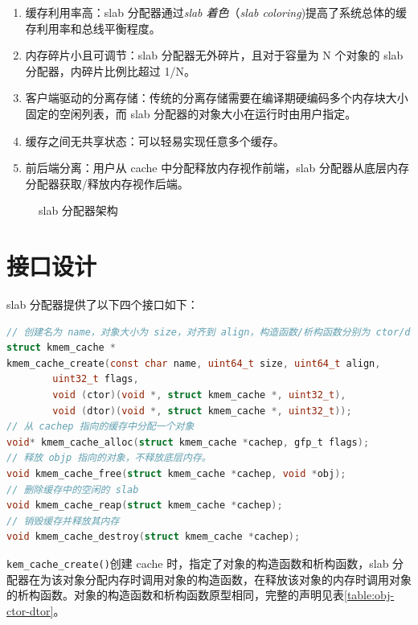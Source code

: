 \documentclass[AutoFakeBold]{LZUThesis}
\begin{document}
\begin{sloppypar}
\begin{enumerate}
\def\labelenumi{\arabic{enumi}.}
\item
  缓存利用率高：slab 分配器通过\emph{slab 着色}（\emph{slab
  coloring})提高了系统总体的缓存利用率和总线平衡程度。
\item
  内存碎片小且可调节：slab 分配器无外碎片，且对于容量为 N 个对象的 slab
  分配器，内碎片比例比超过 1/N。
\item
  客户端驱动的分离存储：传统的分离存储需要在编译期硬编码多个内存块大小固定的空闲列表，而
  slab 分配器的对象大小在运行时由用户指定。
\item
  缓存之间无共享状态：可以轻易实现任意多个缓存。
\item
  前后端分离：用户从 cache 中分配释放内存视作前端，slab
  分配器从底层内存分配器获取/释放内存视作后端。
\end{enumerate}

\begin{figure}[htb]
\centering

\caption{slab 分配器架构}
\end{figure}


\section{接口设计}

slab 分配器提供了以下四个接口如下：

\begin{lstlisting}[language = c]
// 创建名为 name，对象大小为 size，对齐到 align，构造函数/析构函数分别为 ctor/dtor 的缓存。
struct kmem_cache *
kmem_cache_create(const char name, uint64_t size, uint64_t align,
        uint32_t flags,
        void (ctor)(void *, struct kmem_cache *, uint32_t),
        void (dtor)(void *, struct kmem_cache *, uint32_t));
// 从 cachep 指向的缓存中分配一个对象
void* kmem_cache_alloc(struct kmem_cache *cachep, gfp_t flags);
// 释放 objp 指向的对象，不释放底层内存。
void kmem_cache_free(struct kmem_cache *cachep, void *obj);
// 删除缓存中的空闲的 slab
void kmem_cache_reap(struct kmem_cache *cachep);
// 销毁缓存并释放其内存
void kmem_cache_destroy(struct kmem_cache *cachep);

\end{lstlisting}

\texttt{kem\_cache\_create()}创建 cache
时，指定了对象的构造函数和析构函数，slab
分配器在为该对象分配内存时调用对象的构造函数，在释放该对象的内存时调用对象的析构函数。对象的构造函数和析构函数原型相同，完整的声明见表\ref{table:obj-ctor-dtor}。


\end{sloppypar}
\end{document}
